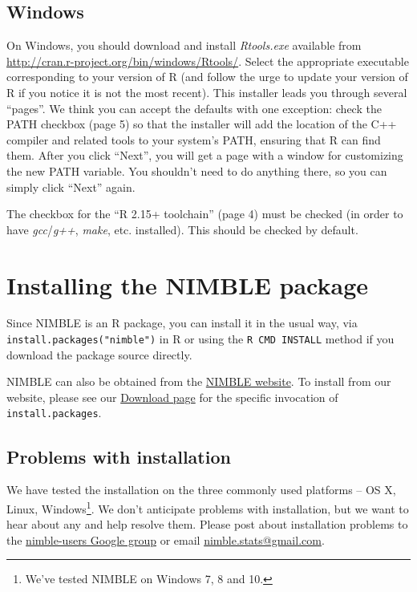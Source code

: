 \documentclass[12pt,oneside]{book}\usepackage[]{graphicx}\usepackage[]{color}
\def\file#1{\textsl{#1}}
\def\cd#1{\texttt{#1}}
\def\nm#1{\textit{#1}}
\begin{document}
\subsection{Windows}
On Windows, you should download and install \file{Rtools.exe}
available from \url{http://cran.r-project.org/bin/windows/Rtools/}.
Select the appropriate executable corresponding to your version of R
(and follow the urge to update your version of R if you notice it
is not the most recent).  This installer leads you through several
``pages''.  We think you can accept the defaults with one exception:
check the PATH checkbox (page 5) so that the installer will add the
location of the C++ compiler and related tools to your system's PATH,
ensuring that R can find them.  After you click ``Next'', you will get
a page with a window for customizing the new PATH variable.  You
shouldn't need to do anything there, so you can simply click ``Next''
again.

The checkbox for the ``R 2.15+ toolchain'' (page 4) must be checked
(in order to have \nm{gcc}/\nm{g++}, \nm{make}, etc. installed).  This
should be checked by default.

\section{Installing the NIMBLE package}

Since NIMBLE is an R package, you can install it in the usual way, via
\\\cd{install.packages("nimble")} in R or using the \cd{R CMD INSTALL}
method if you download the package source directly. 

NIMBLE can also be obtained from the \href{http://r-nimble.org}{NIMBLE website}. To install from our website, please see our \href{http://r-nimble.org/download}{Download page} for the specific invocation of \cd{install.packages}.


\subsection{Problems with installation}
We have tested the installation on the three commonly used platforms
-- OS X, Linux, Windows\footnote{We've tested NIMBLE on Windows 7, 8
  and 10.}.  We don't anticipate problems with installation,
but we want to hear about any and help resolve them. 
Please post about installation problems to the \href{https://groups.google.com/forum/#!forum/nimble-users}{nimble-users Google group} or 
email \href{mailto:nimble.stats@gmail.com}{nimble.stats@gmail.com}.
\end{document}
